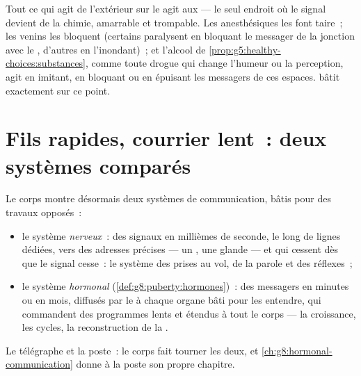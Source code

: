 \begin{remark}\label{rem:g8:nervous-communication:vulnerable}
Tout ce qui agit de l'extérieur sur le  agit aux
 --- le seul endroit où le signal devient de la chimie,
amarrable et trompable. Les anesthésiques les font taire~; les
venins les bloquent (certains paralysent en bloquant le messager de
la jonction avec le , d'autres en l'inondant)~; et l'alcool de
\cref{prop:g5:healthy-choices:substances}, comme toute drogue qui
change l'humeur ou la perception, agit en imitant, en bloquant ou en
épuisant les messagers de ces espaces.
 bâtit exactement sur ce
point.
\end{remark}

\section{Fils rapides, courrier lent~: deux systèmes comparés}

\begin{proposition}\label{prop:g8:nervous-communication:compare}
Le corps montre désormais deux systèmes de communication, bâtis pour
des travaux opposés~:
\begin{itemize}
  \item le système \emph{nerveux}~: des signaux en millièmes de
        seconde, le long de lignes dédiées, vers des adresses
        précises --- un , une glande --- et qui cessent dès
        que le signal cesse~: le système des prises au vol, de la
        parole et des réflexes~;
  \item le système \emph{hormonal}
        (\cref{def:g8:puberty:hormones})~: des messagers en minutes
        ou en mois, diffusés par le  à chaque organe bâti pour
        les entendre, qui commandent des programmes lents et
        étendus à tout le corps --- la croissance, les cycles, la
        reconstruction de la .
\end{itemize}
Le télégraphe et la poste~: le corps fait tourner les deux, et
\cref{ch:g8:hormonal-communication} donne à la poste son propre
chapitre.
\end{proposition}
\admitted

